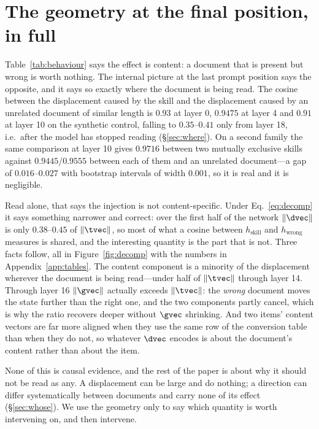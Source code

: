 \section{The geometry at the final position, in full}
\label{app:geometry}

Table~\ref{tab:behaviour} says the effect is content: a document that is present
but wrong is worth nothing. The internal picture at the last prompt position says
the opposite, and it says so exactly where the document is being read. The cosine
between the displacement caused by the skill and the displacement caused by an
unrelated document of similar length is $0.93$ at layer 0, $0.9475$ at layer 4
and $0.91$ at layer 10 on the synthetic control, falling to $0.35$--$0.41$ only
from layer 18, i.e.\ after the model has stopped reading (\S\ref{sec:where}). On
a second family the same comparison at layer 10 gives $0.9716$ between two
mutually exclusive skills against $0.9445$/$0.9555$ between each of them and an
unrelated document---a gap of $0.016$--$0.027$ with bootstrap intervals of width
$0.001$, so it is real and it is negligible.

Read alone, that says the injection is not content-specific. Under
Eq.~\ref{eq:decomp} it says something narrower and correct: over the first half
of the network $\|\dvec\|$ is only $0.38$--$0.45$ of $\|\tvec\|$, so most of what
a cosine between $h_{\text{skill}}$ and $h_{\text{wrong}}$ measures is shared,
and the interesting quantity is the part that is not. Three facts follow, all in
Figure~\ref{fig:decomp} with the numbers in Appendix~\ref{app:tables}. The
content component is a minority of the displacement wherever the document is
being read---under half of $\|\tvec\|$ through layer 14. Through layer 16
$\|\gvec\|$ actually exceeds $\|\tvec\|$: the \emph{wrong} document moves the
state further than the right one, and the two components partly cancel, which is
why the ratio recovers deeper without $\gvec$ shrinking. And two items' content
vectors are far more aligned when they use the same row of the conversion table
than when they do not, so whatever $\dvec$ encodes is about the document's
content rather than about the item.



None of this is causal evidence, and the rest of the paper is about why it
should not be read as any. A displacement can be large and do nothing; a
direction can differ systematically between documents and carry none of its
effect (\S\ref{sec:whose}). We use the geometry only to say which quantity is worth
intervening on, and then intervene.


